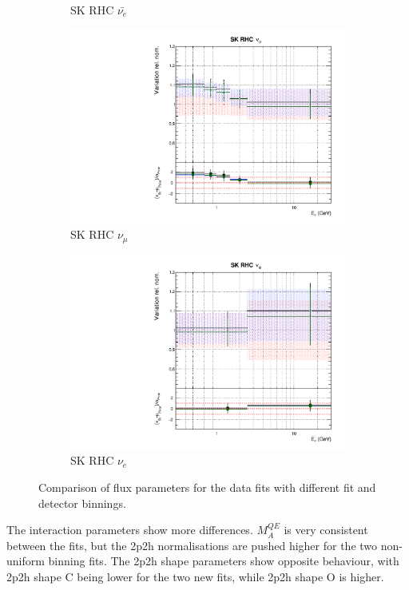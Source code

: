\begin{figure}
\begin{subfigure}{0.24\textwidth}
  \caption{SK RHC $\bar{\nu_e}$}
\end{subfigure}
\begin{subfigure}{0.24\textwidth}
  \centering
  \includegraphics[width=0.95\linewidth]{figs/polydataflux_14}
  \caption{SK RHC $\nu_{\mu}$}
\end{subfigure}
\begin{subfigure}{0.24\textwidth}
  \centering
  \includegraphics[width=0.95\linewidth]{figs/polydataflux_15}
  \caption{SK RHC $\nu_e$}
\end{subfigure}
\caption{Comparison of flux parameters for the data fits with different fit and detector binnings.}
\label{fig:polydataflux}
\end{figure}

The interaction parameters show more differences. $M_A^{QE}$ is very consistent between the fits, but the 2p2h normalisations are pushed higher for the two non-uniform binning fits. The 2p2h shape parameters show opposite behaviour, with 2p2h shape C being lower for the two new fits, while 2p2h shape O is higher.

